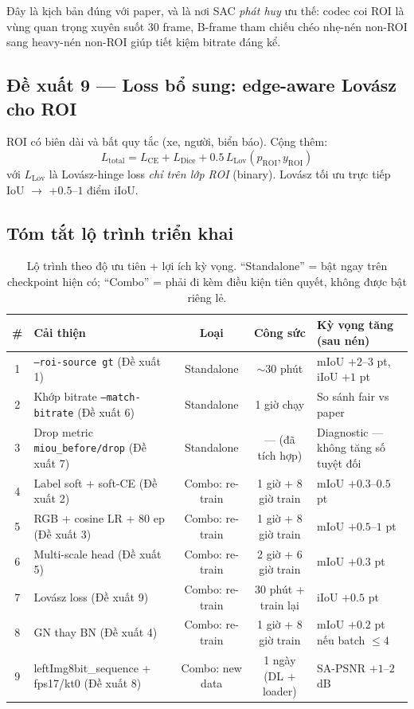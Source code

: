 \documentclass[12pt,a4paper]{article}
\begin{document}
Đây là kịch bản đúng với paper, và là nơi SAC \emph{phát huy} ưu thế: codec coi
ROI là vùng quan trọng xuyên suốt 30 frame, B-frame tham chiếu chéo nhẹ-nén
non-ROI sang heavy-nén non-ROI giúp tiết kiệm bitrate đáng kể.

\subsection{Đề xuất 9 — Loss bổ sung: edge-aware Lovász cho ROI}

ROI có biên dài và bất quy tắc (xe, người, biển báo). Cộng thêm:
\begin{equation}
L_{\text{total}} = L_{\text{CE}} + L_{\text{Dice}} + 0.5\, L_{\text{Lov}}(p_{\text{ROI}}, y_{\text{ROI}})
\end{equation}
với $L_{\text{Lov}}$ là Lovász-hinge loss \emph{chỉ trên lớp ROI} (binary). Lovász
tối ưu trực tiếp IoU $\to$ +$0.5$--$1$ điểm iIoU.

\subsection{Tóm tắt lộ trình triển khai}

\begin{table}[H]
\centering
\caption{Lộ trình theo độ ưu tiên + lợi ích kỳ vọng. ``Standalone'' = bật ngay
trên checkpoint hiện có; ``Combo'' = phải đi kèm điều kiện tiên quyết, không
được bật riêng lẻ.}
\begin{tabular}{clccl}
\toprule
\# & Cải thiện & Loại & Công sức & Kỳ vọng tăng (sau nén) \\
\midrule
1 & \texttt{--roi-source gt} (Đề xuất 1)            & Standalone & $\sim$30 phút        & mIoU $+2$--$3$ pt, iIoU $+1$ pt \\
2 & Khớp bitrate \texttt{--match-bitrate} (Đề xuất 6) & Standalone & 1 giờ chạy           & So sánh fair vs paper \\
3 & Drop metric \texttt{miou\_before/drop} (Đề xuất 7) & Standalone & — (đã tích hợp)      & Diagnostic — không tăng số tuyệt đối \\
4 & Label soft + soft-CE (Đề xuất 2)               & Combo: re-train & 1 giờ + 8 giờ train  & mIoU $+0.3$--$0.5$ pt \\
5 & RGB + cosine LR + 80 ep (Đề xuất 3)            & Combo: re-train & 1 giờ + 8 giờ train  & mIoU $+0.5$--$1$ pt \\
6 & Multi-scale head (Đề xuất 5)                   & Combo: re-train & 2 giờ + 6 giờ train  & mIoU $+0.3$ pt \\
7 & Lovász loss (Đề xuất 9)                        & Combo: re-train & 30 phút + train lại  & iIoU $+0.5$ pt \\
8 & GN thay BN (Đề xuất 4)                         & Combo: re-train & 1 giờ + 8 giờ train  & mIoU $+0.2$ pt nếu batch $\le 4$ \\
9 & leftImg8bit\_sequence + fps17/kt0 (Đề xuất 8)  & Combo: new data & 1 ngày (DL + loader) & SA-PSNR $+1$--$2$ dB \\
\bottomrule
\end{tabular}
\end{table}
\end{document}
